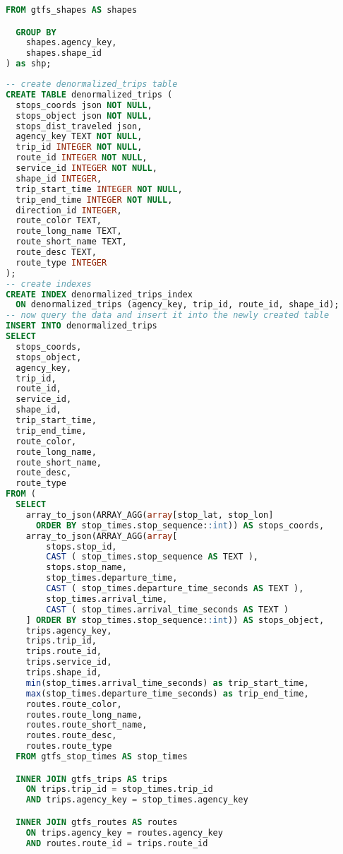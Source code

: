 \begin{newpage}
\begin{lstlisting}[captionpos=t, caption=Erstellen einer denormalized\_shapes Tabelle, label=lst:sql_aggregate_shape, language=SQL]
  FROM gtfs_shapes AS shapes

  GROUP BY
    shapes.agency_key,
    shapes.shape_id
) as shp;
\end{lstlisting}

\begin{lstlisting}[captionpos=t, caption=Erstellen der denormalized\_shapes Tabelle, label=lst:denormalized_shapes, language=SQL]
-- create denormalized_trips table
CREATE TABLE denormalized_trips (
  stops_coords json NOT NULL,
  stops_object json NOT NULL,
  stops_dist_traveled json,
  agency_key TEXT NOT NULL,
  trip_id INTEGER NOT NULL,
  route_id INTEGER NOT NULL,
  service_id INTEGER NOT NULL,
  shape_id INTEGER,
  trip_start_time INTEGER NOT NULL,
  trip_end_time INTEGER NOT NULL,
  direction_id INTEGER,
  route_color TEXT,
  route_long_name TEXT,
  route_short_name TEXT,
  route_desc TEXT,
  route_type INTEGER
);
-- create indexes
CREATE INDEX denormalized_trips_index 
  ON denormalized_trips (agency_key, trip_id, route_id, shape_id);
-- now query the data and insert it into the newly created table
INSERT INTO denormalized_trips
SELECT
  stops_coords,
  stops_object,
  agency_key,
  trip_id,
  route_id,
  service_id,
  shape_id,
  trip_start_time,
  trip_end_time,
  route_color,
  route_long_name,
  route_short_name,
  route_desc,
  route_type
FROM (
  SELECT
    array_to_json(ARRAY_AGG(array[stop_lat, stop_lon]
      ORDER BY stop_times.stop_sequence::int)) AS stops_coords,
    array_to_json(ARRAY_AGG(array[
        stops.stop_id,
        CAST ( stop_times.stop_sequence AS TEXT ),
        stops.stop_name,
        stop_times.departure_time,
        CAST ( stop_times.departure_time_seconds AS TEXT ),
        stop_times.arrival_time,
        CAST ( stop_times.arrival_time_seconds AS TEXT )
    ] ORDER BY stop_times.stop_sequence::int)) AS stops_object,
    trips.agency_key,
    trips.trip_id,
    trips.route_id,
    trips.service_id,
    trips.shape_id,
    min(stop_times.arrival_time_seconds) as trip_start_time,
    max(stop_times.departure_time_seconds) as trip_end_time,
    routes.route_color,
    routes.route_long_name,
    routes.route_short_name,
    routes.route_desc,
    routes.route_type
  FROM gtfs_stop_times AS stop_times

  INNER JOIN gtfs_trips AS trips
    ON trips.trip_id = stop_times.trip_id
    AND trips.agency_key = stop_times.agency_key

  INNER JOIN gtfs_routes AS routes
    ON trips.agency_key = routes.agency_key
    AND routes.route_id = trips.route_id


\end{lstlisting}
\end{newpage}
